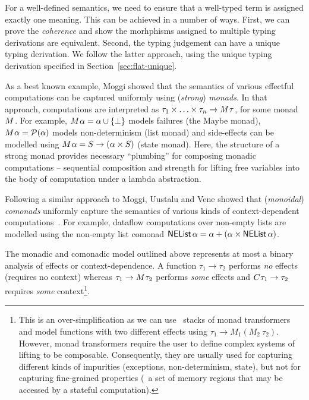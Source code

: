 For a well-defined semantics, we need to ensure that a well-typed term is assigned exactly one
meaning. This can be achieved in a number of ways. First, we can prove the \emph{coherence}
\cite{semantics-bltres} and show the morhphisms assigned to multiple typing derivations are equivalent.
Second, the typing judgement can have a unique typing derivation. We follow the latter approach,
using the unique typing derivation specified in Section~\ref{sec:flat-unique}.

As a best known example, Moggi \cite{monad-notions} showed that the semantics of various effectful
computations can be captured uniformly using (\emph{strong}) \emph{monads}. In that
approach, computations are interpreted as $\tau_1 \times \ldots \times \tau_n \rightarrow M^{}\tau$,
for some monad $M^{}$. For example, $M^{}\alpha = \alpha \cup \{ \bot \}$ models
failures (the Maybe monad), $M^{}\alpha = \mathcal{P}(\alpha)$ models non-determinism (list
monad) and side-effects can be modelled using $M^{}\alpha = S \rightarrow (\alpha \times S)$
(state monad). Here, the structure of a strong monad provides necessary ``plumbing'' for composing
monadic computations -- sequential composition and strength for lifting free variables into the
body of computation under a lambda abstraction.

Following a similar approach to Moggi, Uustalu and Vene \cite{comonads-notions} showed that
(\emph{monoidal}) \emph{comonads} uniformly capture the semantics of various kinds of context-dependent
computations~\cite{comonads-notions}. For example, dataflow computations over non-empty lists
are modelled using the non-empty list comonad $\ident{NEList}\,\alpha = \alpha + (\alpha \times \ident{NEList}\,\alpha)$.

The monadic and comonadic model outlined above represents at most a binary analysis of effects or
context-dependence. A function $\tau_1 \rightarrow \tau_2$ performs \emph{no} effects (requires no
context) whereas $\tau_1 \rightarrow M^{}\tau_2$ performs \emph{some} effects and
$C^{}\tau_1 \rightarrow \tau_2$ requires \emph{some} context\footnote{This is an
over-simplification as we can use \eg~stacks of monad transformers and model functions with
two different effects using $\tau_1 \rightarrow M_1(M_2~\tau_2)$. However, monad transformers
require the user to define complex systems of lifting to be composable. Consequently, they are usually used
for capturing different kinds of impurities (exceptions, non-determinism, state), but not for
capturing fine-grained properties (\eg~a set of memory regions that may be accessed by a
stateful computation).}.

